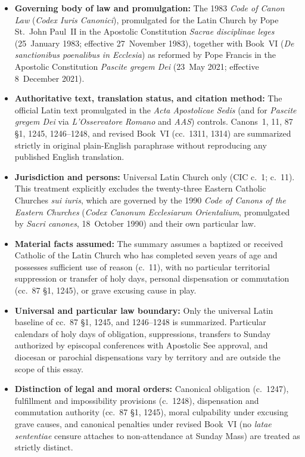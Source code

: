 \begin{itemize}
\item \textbf{Governing body of law and promulgation:} The 1983 \emph{Code of Canon Law} (\emph{Codex Iuris Canonici}), promulgated for the Latin Church by Pope St.\ John Paul~II in the Apostolic Constitution \emph{Sacrae disciplinae leges} (25~January 1983; effective 27~November 1983), together with Book~VI (\emph{De sanctionibus poenalibus in Ecclesia}) as reformed by Pope Francis in the Apostolic Constitution \emph{Pascite gregem Dei} (23~May 2021; effective 8~December 2021).
\item \textbf{Authoritative text, translation status, and citation method:} The official Latin text promulgated in the \emph{Acta Apostolicae Sedis} (and for \emph{Pascite gregem Dei} via \emph{L'Osservatore Romano} and \emph{AAS}) controls. Canons~1, 11, 87 \S 1, 1245, 1246--1248, and revised Book~VI (cc.\ 1311, 1314) are summarized strictly in original plain-English paraphrase without reproducing any published English translation.
\item \textbf{Jurisdiction and persons:} Universal Latin Church only (CIC c.\ 1; c.\ 11). This treatment explicitly excludes the twenty-three Eastern Catholic Churches \emph{sui iuris}, which are governed by the 1990 \emph{Code of Canons of the Eastern Churches} (\emph{Codex Canonum Ecclesiarum Orientalium}, promulgated by \emph{Sacri canones}, 18~October 1990) and their own particular law.
\item \textbf{Material facts assumed:} The summary assumes a baptized or received Catholic of the Latin Church who has completed seven years of age and possesses sufficient use of reason (c.\ 11), with no particular territorial suppression or transfer of holy days, personal dispensation or commutation (cc.\ 87 \S 1, 1245), or grave excusing cause in play.
\item \textbf{Universal and particular law boundary:} Only the universal Latin baseline of cc.\ 87 \S 1, 1245, and 1246--1248 is summarized. Particular calendars of holy days of obligation, suppressions, transfers to Sunday authorized by episcopal conferences with Apostolic See approval, and diocesan or parochial dispensations vary by territory and are outside the scope of this essay.
\item \textbf{Distinction of legal and moral orders:} Canonical obligation (c.\ 1247), fulfillment and impossibility provisions (c.\ 1248), dispensation and commutation authority (cc.\ 87 \S 1, 1245), moral culpability under excusing grave causes, and canonical penalties under revised Book~VI (no \emph{latae sententiae} censure attaches to non-attendance at Sunday Mass) are treated as strictly distinct.

\end{itemize}
